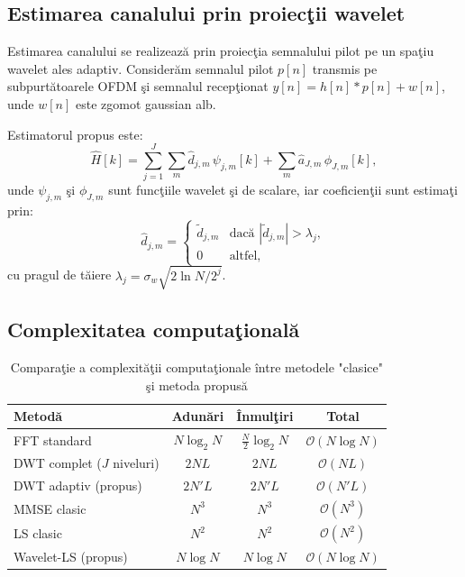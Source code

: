 \documentclass[12pt,a4paper]{article}
\begin{document}
\subsection{Estimarea canalului prin proiecţii wavelet}

Estimarea canalului se realizează prin proiecţia semnalului pilot
pe un spaţiu wavelet ales adaptiv. Considerăm semnalul pilot
$p[n]$ transmis pe subpurtătoarele OFDM şi semnalul recepţionat
$y[n] = h[n] * p[n] + w[n]$, unde $w[n]$ este zgomot gaussian alb.

Estimatorul propus este:
\begin{equation}
\label{eq:estimator}
\hat{H}[k] = \sum_{j=1}^{J} \sum_{m} \hat{d}_{j,m} \, \psi_{j,m}[k] + \sum_{m} \hat{a}_{J,m} \, \phi_{J,m}[k],
\end{equation}
unde $\psi_{j,m}$ şi $\phi_{J,m}$ sunt funcţiile wavelet şi de scalare,
iar coeficienţii sunt estimaţi prin:
\[
\hat{d}_{j,m} = \begin{cases}
\tilde{d}_{j,m} & \text{dacă } |\tilde{d}_{j,m}| > \lambda_j, \\
0 & \text{altfel},
\end{cases}
\]
cu pragul de tăiere $\lambda_j = \sigma_w \sqrt{2 \ln N / 2^j}$.

\subsection{Complexitatea computaţională}

\begin{table}[ht]
\centering
\caption{Comparaţie a complexităţii computaţionale între metodele "clasice" şi metoda propusă}
\label{tab:complexitate}
\begin{tabular}{lccc}
\toprule
Metodă & Adunări & Înmulţiri & Total \\
\midrule
FFT standard & $N \log_2 N$ & $\frac{N}{2} \log_2 N$ & $\mathcal{O}(N \log N)$ \\
DWT complet ($J$ niveluri) & $2NL$ & $2NL$ & $\mathcal{O}(NL)$ \\
DWT adaptiv (propus) & $2N'L$ & $2N'L$ & $\mathcal{O}(N'L)$ \\
MMSE clasic & $N^3$ & $N^3$ & $\mathcal{O}(N^3)$ \\
LS clasic & $N^2$ & $N^2$ & $\mathcal{O}(N^2)$ \\
Wavelet-LS (propus) & $N \log N$ & $N \log N$ & $\mathcal{O}(N \log N)$ \\
\bottomrule
\end{tabular}
\end{table}
\end{document}
